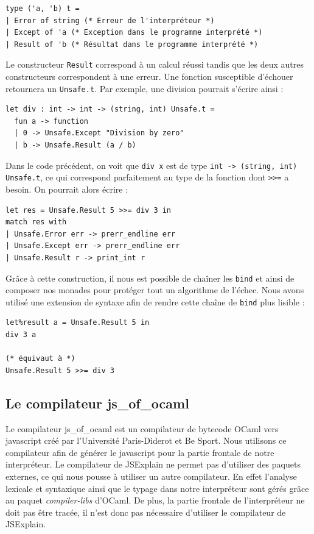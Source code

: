 \documentclass{easychair}
\begin{document}
\begin{verbatim}
type ('a, 'b) t =
| Error of string (* Erreur de l'interpréteur *)
| Except of 'a (* Exception dans le programme interprété *)
| Result of 'b (* Résultat dans le programme interprété *)
\end{verbatim}

Le constructeur \verb|Result| correspond à un calcul réussi tandis que les deux 
autres constructeurs correspondent à une erreur. Une fonction susceptible 
d'échouer retournera un \verb|Unsafe.t|. Par exemple, une division pourrait 
s'écrire ainsi :

\begin{verbatim}
let div : int -> int -> (string, int) Unsafe.t =
  fun a -> function
  | 0 -> Unsafe.Except "Division by zero"
  | b -> Unsafe.Result (a / b)
\end{verbatim}

Dans le code précédent, on voit que \verb|div x| est de type \verb|int -> (string, int) Unsafe.t|,
ce qui correspond parfaitement au type de la fonction dont \verb|>>=| a besoin. On pourrait alors écrire :

\begin{verbatim}
let res = Unsafe.Result 5 >>= div 3 in
match res with
| Unsafe.Error err -> prerr_endline err
| Unsafe.Except err -> prerr_endline err
| Unsafe.Result r -> print_int r
\end{verbatim}

Grâce à cette construction, il nous est possible de chaîner les \verb|bind| et 
ainsi de composer nos monades pour protéger tout un algorithme de l'échec. Nous 
avons utilisé une extension de syntaxe afin de rendre cette chaîne de 
\verb|bind| plus lisible :

\begin{verbatim}
let%result a = Unsafe.Result 5 in
div 3 a

(* équivaut à *)
Unsafe.Result 5 >>= div 3
\end{verbatim}	

\subsection{Le compilateur js\_of\_ocaml}
Le compilateur js\_of\_ocaml est un compilateur de bytecode OCaml vers 
javascript créé par l'Université Paris-Diderot et Be Sport. Nous utilisons ce 
compilateur afin de générer le javascript pour la partie frontale de notre 
interpréteur. Le compilateur de JSExplain ne permet pas d'utiliser des paquets 
externes, ce qui nous pousse à utiliser un autre compilateur. En effet l'analyse 
lexicale et syntaxique ainsi que le typage dans notre interpréteur sont gérés 
grâce au paquet \emph{compiler-libs} d'OCaml. De plus, la partie frontale de 
l'interpréteur ne doit pas être tracée, il n'est donc pas nécessaire d'utiliser 
le compilateur de JSExplain.
\end{document}
